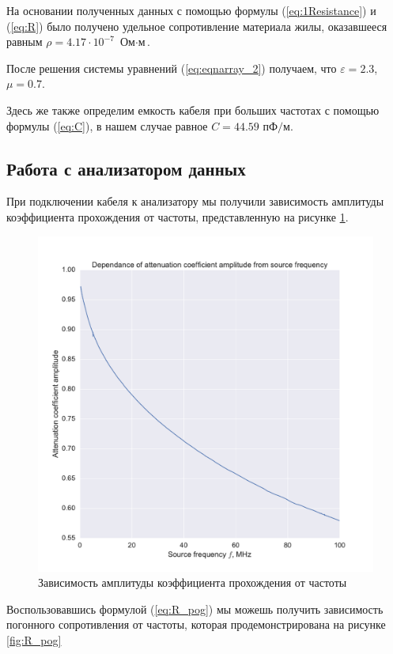 \documentclass[a4paper, 12pt]{article}
\begin{document}
На основании полученных данных с помощью формулы (\ref{eq:1Resistance}) и (\ref{eq:R}) было получено удельное сопротивление материала жилы, оказавшееся равным $\boxed{\rho = 4.17 \cdot 10^{-7} \text{ Ом$\cdot$м}}$.

После решения системы уравнений (\ref{eq:eqnarray_2}) получаем, что $\varepsilon = 2.3$, $\mu = 0.7$.

Здесь же также определим емкость кабеля при больших частотах с помощью формулы (\ref{eq:C}), в нашем случае равное $\boxed{C = 44.59 \text{ пФ/м}}$.

\subsection{Работа с анализатором данных}

При подключении кабеля к анализатору мы получили зависимость амплитуды коэффициента прохождения от частоты, представленную на рисунке \ref{fig:pt_4_amp}.

\begin{figure}[H]
	\centering
	\includegraphics[width=0.7\linewidth]{pt_4.pdf}
	\caption{Зависимость амплитуды коэффициента прохождения от частоты}
	\label{fig:pt_4_amp}
\end{figure}

Воспользовавшись формулой (\ref{eq:R_pog}) мы можешь получить зависимость погонного сопротивления от частоты, которая продемонстрирована на рисунке \ref{fig:R_pog}
\end{document}
